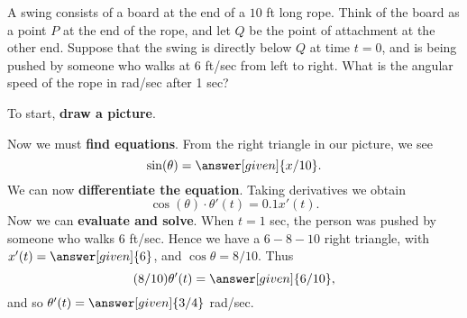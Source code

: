 \documentclass{ximera}
\begin{document}
\begin{example}
A swing consists of a board at the end of a $10$ ft long rope.  Think
of the board as a point $P$ at the end of the rope, and let $Q$ be the
point of attachment at the other end.  Suppose that the swing is
directly below $Q$ at time $t=0$, and is being pushed by someone who
walks at 6 ft/sec from left to right.  What is the angular speed of
the rope in rad/sec after 1 sec?


\begin{explanation}
To start, \textbf{draw a picture}.
\begin{image}
\end{image}
Now we must \textbf{find equations}. From the right triangle in our
picture, we see
\[
\sin(\theta)=\answer[given]{x/10}.
\]
We can now \textbf{differentiate the equation}. Taking derivatives we obtain 
\[
\cos(\theta)\cdot \theta'(t)=0.1 x'(t).
\]
Now we can \textbf{evaluate and solve}.  When $t=1$ sec, the person
was pushed by someone who walks $6$ ft/sec. Hence we have a $6-8-10$
right triangle, with $x'(t) = \answer[given]{6}$, and
$\cos\theta=8/10$. Thus
\[
(8/10) \theta'(t) =\answer[given]{6/10},
\]
and so  $\theta'(t)=\answer[given]{3/4}$ rad/sec.
\end{explanation} 
\end{example}
\end{document}
